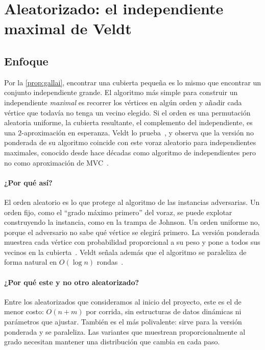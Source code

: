 \section{Aleatorizado: el independiente maximal de Veldt}\label{sec:rmis}

\subsection{Enfoque}
Por la \cref{prop:gallai}, encontrar una cubierta pequeña es lo mismo que encontrar un conjunto independiente grande. El algoritmo más simple para construir un independiente \emph{maximal} es recorrer los vértices en algún orden y añadir cada vértice que todavía no tenga un vecino elegido. Si el orden es una permutación aleatoria uniforme, la cubierta resultante, el complemento del independiente, es una $2$-aproximación en esperanza. Veldt lo prueba~\citep{veldt2024}, y observa que la versión no ponderada de su algoritmo coincide con este voraz aleatorio para independientes maximales, conocido desde hace décadas como algoritmo de independientes pero no como aproximación de MVC~\citep{veldt2024}.

\paragraph{¿Por qué así?} El orden aleatorio es lo que protege al algoritmo de las instancias adversarias. Un orden fijo, como el ``grado máximo primero'' del voraz, se puede explotar construyendo la instancia, como en la trampa de Johnson. Un orden uniforme no, porque el adversario no sabe qué vértice se elegirá primero. La versión ponderada muestrea cada vértice con probabilidad proporcional a su peso y pone a todos sus vecinos en la cubierta~\citep{veldt2024}. Veldt señala además que el algoritmo se paraleliza de forma natural en $O(\log n)$ rondas~\citep{veldt2024}.

\paragraph{¿Por qué este y no otro aleatorizado?} Entre los aleatorizados que consideramos al inicio del proyecto, este es el de menor costo: $O(n+m)$ por corrida, sin estructuras de datos dinámicas ni parámetros que ajustar. También es el más polivalente: sirve para la versión ponderada y se paraleliza. Las variantes que muestrean proporcionalmente al grado necesitan mantener una distribución que cambia en cada paso.

